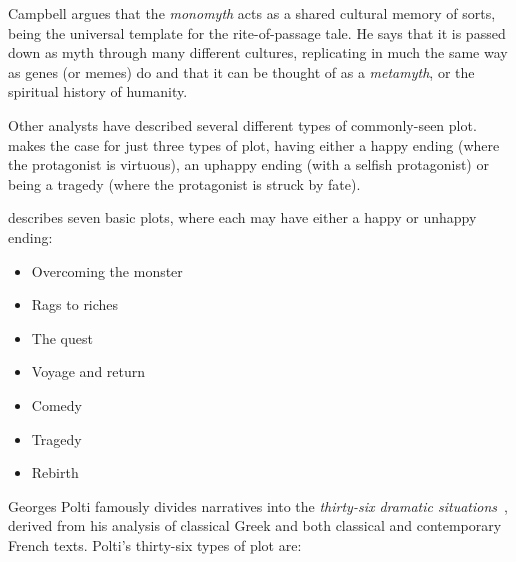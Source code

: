 \documentclass[11pt]{report}
\begin{document}
Campbell argues that the \emph{monomyth} acts as a shared cultural memory of
sorts, being the universal template for the rite-of-passage tale. He says that
it is passed down as myth through many different cultures, replicating in much the same way
as genes (or memes) do and that it can be thought of as a \emph{metamyth}, or the
spiritual history of humanity.

Other analysts have described several different types of commonly-seen plot.
\citet{harris1959basic} makes the case for just three types of plot, having
either a happy ending (where the protagonist is virtuous), an uphappy ending
(with a selfish protagonist) or being a tragedy (where the protagonist is struck
by fate).

\citet{booker2004seven} describes seven basic plots, where each may have either a
happy or unhappy ending:
\begin{itemize}
  \item Overcoming the monster
  \item Rags to riches
  \item The quest
  \item Voyage and return
  \item Comedy
  \item Tragedy
  \item Rebirth
\end{itemize}

Georges Polti famously divides narratives into the \emph{thirty-six dramatic
  situations}~\citep{polti1921thirty}, derived from his analysis of classical
Greek and both classical and contemporary French texts. Polti's thirty-six types
of plot are:
\end{document}
